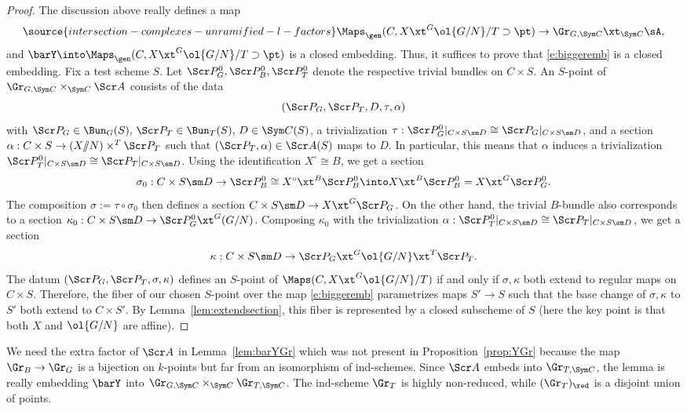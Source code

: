 \begin{proof}
The discussion above really defines a map
\begin{equation} \label{e:biggeremb}
\source{intersection-complexes-unramified-l-factors}
    \Maps_\gen(C, X \xt^G \ol{G/N}/T \supset \pt) \to \Gr_{G,\Sym C} \xt_{\Sym C} \sA,
\end{equation}
and $\barY \into \Maps_\gen(C, X\xt^G \ol{G/N}/T \supset \pt)$ is a closed
embedding. Thus, it suffices to prove that \eqref{e:biggeremb} is a closed
embedding.
Fix a test scheme $S$.
Let $\Scr P^0_G,\Scr P^0_B,\Scr P^0_T$ denote the respective trivial bundles on $C\times S$.
An $S$-point of $\Gr_{G,\Sym C} \times_{\Sym C} \Scr A$
consists of the data
\[ (\Scr P_G,\Scr P_T,D,\tau,\alpha)  \]
with $\Scr P_G\in \Bun_G(S),\, \Scr P_T \in \Bun_T(S),\, D\in \Sym C(S)$,
a trivialization $\tau : \Scr P^0_G|_{C\times S\sm D}\cong \Scr P_G|_{C\times S\sm D}$,
and a section
$\alpha: C\times S \to (X/\!\!/N)\times^T \Scr P_T$ such that
$(\Scr P_T,\alpha) \in \Scr A(S)$ maps to $D$.
In particular, this means that $\alpha$ induces a trivialization
$\Scr P_T^0|_{C\times S\sm D} \cong \Scr P_T|_{C\times S\sm D}$.
Using the identification $X^\circ \cong B$, we get a section
\[ \sigma_0 : C\times S\sm D \to \Scr P^0_B \cong X^\circ \xt^B \Scr P_B^0
\into X \xt^B \Scr P_B^0= X \xt^G \Scr P_G^0. \]
The composition $\sigma := \tau \circ \sigma_0$ then defines a section
$C\times S \sm D \to X\xt^G \Scr P_G$.
On the other hand, the trivial $B$-bundle also corresponds to a section
$\kappa_0 : C\times S \sm D \to \Scr P_G^0 \xt^G (G/N)$.
Composing $\kappa_0$ with the trivialization $\alpha:\Scr P_T^0|_{C\times S\sm D} \cong \Scr P_T|_{C\times S\sm D}$, we get a section
\[ \kappa : C\times S \sm D \to \Scr P_G \xt^G \ol{G/N} \xt^T \Scr P_T. \]
The datum $(\Scr P_G, \Scr P_T, \sigma, \kappa)$ defines an $S$-point
of $\Maps(C, X\xt^G \ol{G/N}/T)$ if and only if $\sigma,\kappa$ both extend to regular
maps on $C\times S$.
Therefore, the fiber of our chosen $S$-point over
the map \eqref{e:biggeremb}
parametrizes maps $S' \to S$
such that the base change of $\sigma,\kappa$ to $S'$ both extend to
$C\times S'$. By Lemma~\ref{lem:extendsection},
this fiber is represented by a closed subscheme of $S$ (here the key point
is that both $X$ and $\ol{G/N}$ are affine).
\end{proof}

\begin{rem}
\notready
We need the extra factor of $\Scr A$ in Lemma~\ref{lem:barYGr} which was
not present in Proposition~\ref{prop:YGr} because the map $\Gr_B \to \Gr_G$
is a bijection on $k$-points but far from an isomorphism of ind-schemes.
Since $\Scr A$ embeds into $\Gr_{T,\Sym C}$, the lemma is really
embedding $\barY$ into $\Gr_{G,\Sym C}\times_{\Sym C} \Gr_{T,\Sym C}$.
The ind-scheme $\Gr_T$ is highly non-reduced, while $(\Gr_T)_\red$ is a disjoint
union of points.
\end{rem}

